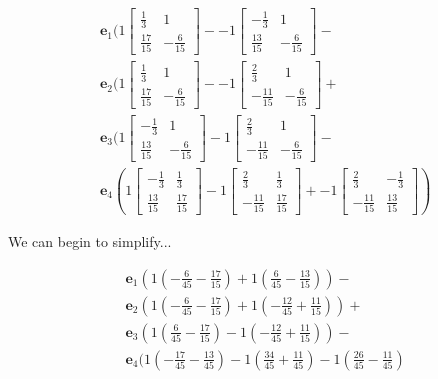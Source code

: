 \documentclass{tufte-book}
\newcommand{\vct}{\mathbf}
\theoremstyle{mytheoremstyle}
\theoremstyle{mylemstyle}
\theoremstyle{mydefstyle}
\begin{document}
\begin{align*}
&\vct{e}_1(1
\begin{bmatrix}
\frac{1}{3} & 1 \\
\frac{17}{15} & {-\frac{6}{15}}
\end{bmatrix}
- {-1}
\begin{bmatrix}
-\frac{1}{3} & 1 \\
\frac{13}{15} & {-\frac{6}{15}}
\end{bmatrix}
- \\
&\vct{e}_2(1
\begin{bmatrix}
\frac{1}{3} & 1 \\
\frac{17}{15} & {-\frac{6}{15}}
\end{bmatrix} - {-1}
\begin{bmatrix}
\frac{2}{3} & 1 \\
{-\frac{11}{15}} & {-\frac{6}{15}}
\end{bmatrix}
+\\
&\vct{e}_3(1
\begin{bmatrix}
-\frac{1}{3} & 1 \\
\frac{13}{15} & {-\frac{6}{15}}
\end{bmatrix} 
- 1
\begin{bmatrix}
\frac{2}{3} & 1 \\
{-\frac{11}{15}} & {-\frac{6}{15}}
\end{bmatrix}
-\\
&\vct{e}_4(1
\begin{bmatrix}
-\frac{1}{3} &\frac{1}{3}\\
\frac{13}{15} &\frac{17}{15}
\end{bmatrix}
-1
\begin{bmatrix}
\frac{2}{3} &\frac{1}{3}\\
{-\frac{11}{15}} &\frac{17}{15}
\end{bmatrix}
+{-1}
\begin{bmatrix}
\frac{2}{3} & -\frac{1}{3} \\
{-\frac{11}{15}} & \frac{13}{15}
\end{bmatrix})
\end{align*}

We can begin to simplify...

\begin{align*}
& \vct{e}_1( 1(-\frac{6}{45}-\frac{17}{15}) + 1(\frac{6}{45}-\frac{13}{15}))-\\
& \vct{e}_2(1(-\frac{6}{45}-\frac{17}{15}) + 1(-\frac{12}{45}+\frac{11}{15}))+\\
& \vct{e}_3(1(\frac{6}{45} - \frac{17}{15}) - 1(-\frac{12}{45}+\frac{11}{15}))-\\
& \vct{e}_4(1(-\frac{17}{45}-\frac{13}{45}) -1(\frac{34}{45}+\frac{11}{45}) -1(\frac{26}{45} - \frac{11}{45})
\end{align*}
\end{document}
